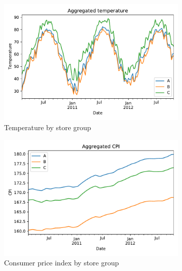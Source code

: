 \documentclass[english, 12pt, a4paper, sci, utf8, a-1b, online]{aaltothesis}
\begin{document}
\begin{abstractpage}[english]
\begin{figure}[htb]
	\begin{subfigure}[b]{0.5\textwidth}
		\centering
		\includegraphics[width=\textwidth]{../plots/dataset/dataset_plot_temperature.pdf}
		\caption{Temperature by store group}
		\label{fig:data_temp}
	\end{subfigure}
	\hfill
	\begin{subfigure}[b]{0.5\textwidth}
		\centering
		\includegraphics[width=\textwidth]{../plots/dataset/dataset_plot_CPI.pdf}
		\caption{Consumer price index by store group}
		\label{fig:data_cpi}
	\end{subfigure}
	\begin{subfigure}[b]{0.5\textwidth}
		\centering

\end{subfigure}
\end{figure}
\end{abstractpage}
\end{document}
